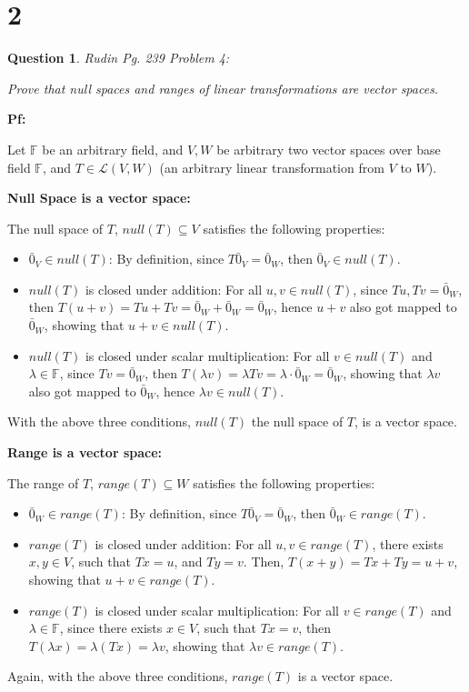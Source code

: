 \documentclass{article}
\newtheorem{question}{Question}
\begin{document}
\section*{2}
\begin{myBox}[]{}
    \begin{question}
        Rudin Pg. 239 Problem 4:

        Prove that null spaces and ranges of linear transformations are vector spaces.
    \end{question}
\end{myBox}

\textbf{Pf:}

Let $\mathbb{F}$ be an arbitrary field, and $V, W$ be arbitrary two vector spaces over base field $\mathbb{F}$, and $T\in\mathcal{L}(V,W)$ (an arbitrary linear transformation from $V$ to $W$).

\hfil

\textbf{Null Space is a vector space:}

The null space of $T$, $null(T)\subseteq V$ satisfies the following properties:
\begin{itemize}
    \item $\bar{0}_V\in null(T)$: By definition, since $T\bar{0}_V = \bar{0}_W$, then $\bar{0}_V\in null(T)$.
    \item $null(T)$ is closed under addition: For all $u,v\in null(T)$, since $Tu, Tv = \bar{0}_W$, then $T(u+v)=Tu+Tv = \bar{0}_W+\bar{0}_W=\bar{0}_W$, hence $u+v$ also got mapped to $\bar{0}_W$, showing that $u+v\in null(T)$.
    \item $null(T)$ is closed under scalar multiplication: For all $v\in null(T)$ and $\lambda\in\mathbb{F}$, since $Tv=\bar{0}_W$, then $T(\lambda v)=\lambda Tv = \lambda\cdot \bar{0}_W = \bar{0}_W$, showing that $\lambda v$ also got mapped to $\bar{0}_W$, hence $\lambda v\in null(T)$.
\end{itemize}
With the above three conditions, $null(T)$ the null space of $T$, is a vector space.

\hfil

\textbf{Range is a vector space:}

The range of $T$, $range(T)\subseteq W$ satisfies the following properties:
\begin{itemize}
    \item $\bar{0}_W\in range(T)$: By definition, since $T\bar{0}_V=\bar{0}_W$, then $\bar{0}_W\in range(T)$.
    \item $range(T)$ is closed under addition: For all $u,v\in range(T)$, there exists $x,y\in V$, such that $Tx= u$, and $Ty = v$. Then, $T(x+y)=Tx+Ty = u+v$, showing that $u+v\in range(T)$.
    \item $range(T)$ is closed under scalar multiplication: For all $v\in range(T)$ and $\lambda\in \mathbb{F}$, since there exists $x\in V$, such that $Tx=v$, then $T(\lambda x)=\lambda (Tx)=\lambda v$, showing that $\lambda v\in range(T)$.
\end{itemize}
Again, with the above three conditions, $range(T)$ is a vector space.
\end{document}
